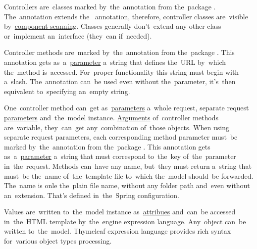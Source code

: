 \noindent Controllers are~classes marked by~the~annotation  from the~package .
The~annotation extends the~ annotation, therefore, controller classes are~visible by~\hyperref[iocannotations]{component scanning}.
Classes generally don't~extend any other class or~implement an~interface (they~can if~needed).

Controller methods are~marked by~the~annotation  from the~package .
This annotation gets as~a~\hyperref[parameterargument]{parameter} a~string that defines the~URL by~which the~method is~accessed.
For~proper functionality this string must begin with a~slash.
The~annotation can~be used even without the~parameter, it's~then equivalent to~specifying an~empty string.

One~controller method can~get as~\hyperref[parameterargument]{parameters} a~whole request, separate request \hyperref[jspattributeparameter]{parameters} and~the~model instance.
\hyperref[parameterargument]{Arguments} of~controller methods are~variable, they~can~get any~combination of~those objects.
When using separate request parameters, each corresponding method parameter must~be marked by~the~annotation  from the~package .
This annotation gets as~a~\hyperref[parameterargument]{parameter} a~string that must correspond to~the~key of~the~parameter in~the~request.
Methods can~have any name, but~they must return a~string that must~be the~name of~the~template file to~which the~model should~be forwarded.
The~name is onle the~plain file name, without any folder path and~even without an~extension. That's defined in~the~Spring configuration.

Values are~written to~the~model instance as~\hyperref[jspattributeparameter]{attribues} and~can~be accessed in~the~HTML template by~the~engine expression language.
Any~object can~be written to~the~model.
Thymeleaf expression language provides rich syntax for~various object types processing.

